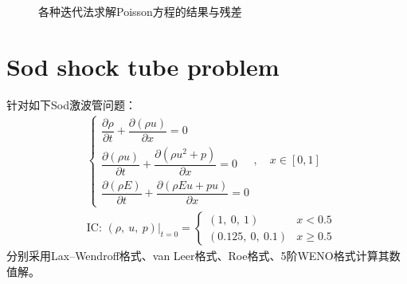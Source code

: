 \documentclass[11pt]{article}
\begin{document}
\begin{figure}[htbp]

	\caption{\label{fig:poisson2}各种迭代法求解Poisson方程的结果与残差}
\end{figure}


\newpage
\section{Sod shock tube problem}
针对如下Sod激波管问题：
\begin{align}
	 & \left\{\begin{array}{l}
		\dfrac{\partial\rho}{\partial t}+\dfrac{\partial(\rho u)}{\partial x}=0         \\[8pt]
		\dfrac{\partial(\rho u)}{\partial t}+\dfrac{\partial(\rho u^2+p)}{\partial x}=0 \\[8pt]
		\dfrac{\partial(\rho E)}{\partial t}+\dfrac{\partial(\rho Eu+pu)}{\partial x}=0
	\end{array}\right.,\quad x\in[0,1] \label{eqn:euler}           \\
	 & \text{IC: }\left(\rho,\ u,\ p\right)|_{t=0}=\left\{\begin{array}{ll}
		(1,\ 0,\ 1)       & x<0.5    \\
		(0.125,\ 0,\ 0.1) & x\geq0.5
	\end{array}\right.
\end{align}
分别采用Lax–Wendroff格式、van Leer格式、Roe格式、5阶WENO格式计算其数值解。
\end{document}
